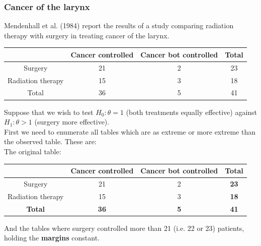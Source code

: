 \documentclass[a4paper]{article}\usepackage[]{graphicx}\usepackage[]{xcolor}
\begin{document}
\subsubsection{Cancer of the larynx}
Mendenhall et al. (1984) report the results of a study comparing radiation therapy with surgery in treating cancer of the larynx.
\begin{table}[H]
	\centering
	\begin{tabular}{@{}c|cc|c@{}}
	\toprule
				      & \textbf{Cancer controlled} & \textbf{Cancer bot controlled} & \textbf{Total} \\ \midrule
	Surgery           & 21                         & 2                              & 23             \\
	Radiation therapy & 15                         & 3                              & 18             \\ \midrule
	Total             & 36                         & 5                              & 41             \\ \bottomrule
	\end{tabular}
\end{table}
Suppose that we wish to test \( H_0: \theta =1 \) (both treatments equally effective) against \( H_1: \theta >1 \) (surgery more effective).\\
First we need to enumerate all tables which are \textcolor{mygreen}{as extreme} or \textcolor{myred}{more extreme} than the observed table. These are:\\
The original table:
\begin{table}[H]
	\centering
	\begin{tabular}{@{}c|cc|c@{}}
	\toprule
				      & \textbf{Cancer controlled} & \textbf{Cancer bot controlled} & \textbf{Total} \\ \midrule
	Surgery           & \textcolor{mygreen}{21}    & 2                              & \textbf{23}    \\
	Radiation therapy & 15                         & 3                              & \textbf{18}    \\ \midrule
	\textbf{Total}    & \textbf{36}                & \textbf{5}                     & \textbf{41}    \\ \bottomrule
	\end{tabular}
\end{table}
And the tables where surgery controlled more than \textcolor{mygreen}{21} (i.e. \textcolor{myred}{22} or \textcolor{myred}{23}) patients, holding the \textbf{margins} constant.
\end{document}
